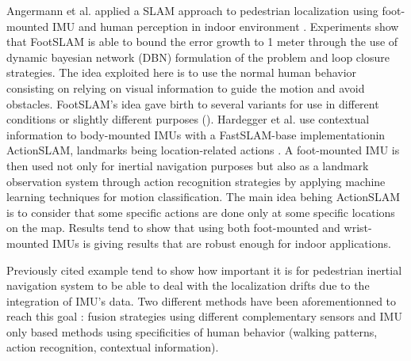 Angermann et al. applied a SLAM approach to pedestrian localization using foot-mounted IMU and human perception in indoor environment \cite{angermann2012footslam}. Experiments show that
FootSLAM is able to bound the error growth to 1 meter through the use of dynamic bayesian network (DBN) formulation of the problem and loop closure strategies. The idea exploited here is to use the normal human behavior 
consisting on relying on visual information to guide the motion and avoid obstacles. FootSLAM's idea gave birth to several variants for use in different conditions or slightly different purposes (\cite{puyol2012complexity,bruno2011wislam}).
Hardegger et al. use contextual information to body-mounted IMUs with a FastSLAM-base implementationin ActionSLAM, landmarks being location-related actions \cite{hardegger2012actionslam}. 
A foot-mounted IMU is then used not only for inertial navigation purposes but also as a landmark observation system through action recognition strategies by applying machine learning techniques for motion classification.
The main idea behing ActionSLAM is to consider that some specific actions are done only at some specific locations on the map. Results tend to show that using both foot-mounted and wrist-mounted IMUs
is giving results that are robust enough for indoor applications.

Previously cited example tend to show how important it is for pedestrian inertial navigation system to be able to deal with the localization drifts due to the integration of IMU's data. 
Two different methods have been aforementionned to reach this goal : fusion strategies using different complementary sensors and IMU only based methods using specificities
of human behavior (walking patterns, action recognition, contextual information).